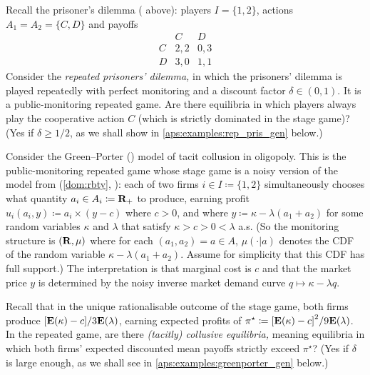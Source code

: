 \begin{example}
	\label{example:rep_pris}
	Recall the prisoner's dilemma ( above): players $I=\{1,2\}$, actions $A_1=A_2=\{C,D\}$ and payoffs
	\begin{equation*}
		\begin{array}{c|cc}
			  & C   & D   \\ \hline
			C & 2,2 & 0,3 \\
			D & 3,0 & 1,1
		\end{array} 
	\end{equation*}
	Consider the \emph{repeated prisoners' dilemma,} in which the prisoners' dilemma is played repeatedly with perfect monitoring and a discount factor $\delta \in (0,1)$. It is a public-monitoring repeated game. Are there equilibria in which players always play the cooperative action $C$ (which is strictly dominated in the stage game)? (Yes if $\delta \geq 1/2$, as we shall show in \cref{aps:examples:rep_pris_gen} below.)
\end{example}

\begin{example}
	\label{example:greenporter}
	Consider the Green--Porter (\citeyear{GreenPorter1984}) model of tacit collusion in oligopoly. This is the public-monitoring repeated game whose stage game is a noisy version of the \textcite{Cournot1838} model from  (\cref{dom:rbty}, ): each of two firms $i \in I \coloneqq \{1,2\}$ simultaneously chooses what quantity $a_i \in A_i \coloneqq \mathbf{R}_+$ to produce, earning profit $u_i\left(a_i,y\right) \coloneqq a_i \times (y - c)$ where $c>0$, and where $y \coloneqq \kappa - \lambda(a_1+a_2)$ for some random variables $\kappa$ and $\lambda$ that satisfy $\kappa > c > 0 < \lambda$ a.s.
	(So the monitoring structure is $(\mathbf{R},\mu)$ where for each $(a_1,a_2) = a \in A$, $\mu(\cdot|a)$ denotes the CDF of the random variable $\kappa - \lambda(a_1+a_2)$. Assume for simplicity that this CDF has full support.) The interpretation is that marginal cost is $c$ and that the market price $y$ is determined by the noisy inverse market demand curve $q \mapsto \kappa - \lambda q$.

	Recall that in the unique rationalisable outcome of the stage game, both firms produce $\left[\E(\kappa)-c\right]/3\E(\lambda)$, earning expected profits of $\pi^\star \coloneqq \left[\E(\kappa)-c\right]^2 / 9 \E(\lambda)$. In the repeated game, are there \emph{(tacitly) collusive equilibria,} meaning equilibria in which both firms' expected discounted mean payoffs strictly exceed $\pi^\star$? (Yes if $\delta$ is large enough, as we shall see in \cref{aps:examples:greenporter_gen} below.)
\end{example}

